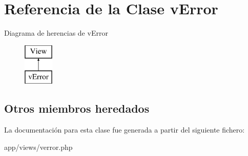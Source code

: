 \hypertarget{classv_error}{}\section{Referencia de la Clase v\+Error}
\label{classv_error}
Diagrama de herencias de v\+Error\begin{figure}[H]
\begin{center}
\leavevmode
\includegraphics[height=2.000000cm]{classv_error}
\end{center}
\end{figure}
\subsection*{Otros miembros heredados}


La documentación para esta clase fue generada a partir del siguiente fichero\+:\begin{DoxyCompactItemize}
\item 
app/views/verror.\+php\end{DoxyCompactItemize}
